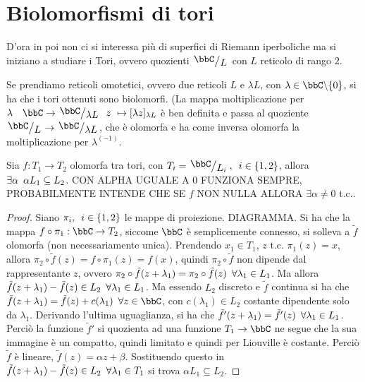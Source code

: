 \section{Biolomorfismi di tori}
D'ora in poi non ci si interessa più di superfici di Riemann iperboliche ma si iniziano a studiare i Tori, ovvero quozienti $\quotient{\bbC}{L}$ con $L$ reticolo di rango $2$.


\begin{osservazione}
Se prendiamo reticoli omotetici, ovvero due reticoli $L$ e $\lambda L$, con $\lambda \in \bbC\minus\{ 0\}$, si ha che i tori ottenuti sono biolomorfi. (La mappa moltiplicazione per $\lambda \quad \bbC \rightarrow \quotient{\bbC}{\lambda L} \hquad z\ \mapsto [\lambda z]_{\lambda L} $ è ben definita e passa al quoziente $\quotient{\bbC}{L}\rightarrow \quotient{\bbC}{\lambda L}$, che è olomorfa e ha come inversa olomorfa la moltiplicazione per $\lambda^{(-1)}$.
\end{osservazione}

\begin{fatto}Sia $f:T_1\rightarrow T_2$ olomorfa tra tori, con $T_i=\quotient{\bbC}{L_i},\hquad i\in \{ 1,2\}$, allora $\exists\alpha \hskip0.5em\relax \alpha L_1\subseteq L_2$.
CON ALPHA UGUALE A $0$ FUNZIONA SEMPRE, PROBABILMENTE INTENDE CHE SE $f$ NON NULLA ALLORA $\exists \alpha \ne 0$ t.c..
\end{fatto}
\begin{proof} Siano $\pi_i,\hskip0.5em\relax i\in \{ 1,2\}$ le mappe di proiezione. DIAGRAMMA.
Si ha che la mappa $f\circ\pi_1: \bbC\rightarrow T_2$, siccome $\bbC$ è semplicemente connesso, si solleva a $\tilde{f}$ olomorfa (non necessariamente unica).
Prendendo $x_1\in T_1$, $z$ t.c. $\pi_1(z)=x$, allora $\pi_2\circ\tilde{f} (z) = f\circ \pi_1 (z)= f(x)$, quindi $\pi_2\circ \tilde{f}$ non dipende dal rappresentante $z$, ovvero $\pi_2\circ \tilde{f} (z+\lambda_1)=\pi_2\circ \tilde{f} (z)\hskip0.5em\relax \forall \lambda_1\in L_1$.
Ma allora $\tilde{f} (z+\lambda_1) - \tilde{f} (z) \in L_2 \hskip0.5em\relax \forall \lambda_1 \in L_1$.
Ma essendo $L_2$ discreto e $\tilde{f}$ continua si ha che $\tilde{f}(z+\lambda_1)=\tilde{f}(z)+c(\lambda_1)\hquad \forall z\in\bbC$, con $c(\lambda_1)\in L_2$ costante dipendente solo da $\lambda_1$.
Derivando l'ultima uguaglianza, si ha che $\tilde{f}'(z+\lambda_1)=\tilde{f}'(z) \hskip0.5em\relax\forall \lambda_1\in L_1$.
Perciò la funzione $\tilde{f}'$ si quozienta ad una funzione  $T_1\rightarrow \bbC$ ne segue che la sua immagine è un compatto, quindi limitato e quindi per Liouville è costante. 
Perciò $\tilde{f}$ è lineare, $\tilde{f}(z)=\alpha z+\beta$.
Sostituendo questo in $\tilde{f} (z+\lambda_1) - \tilde{f} (z) \in L_2 \hskip0.5em\relax \forall \lambda_1 \in T_1$ si trova $\alpha L_1\subseteq L_2$.
\end{proof}

